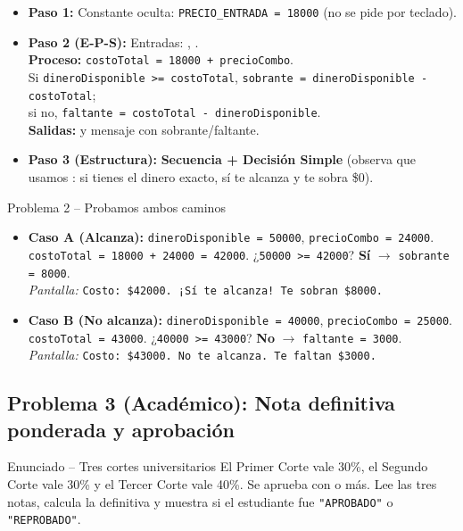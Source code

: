 \documentclass[11pt,letterpaper]{article}
\begin{document}
\begin{itemize}
  \item \textbf{Paso 1:} Constante oculta: \texttt{PRECIO\_ENTRADA = 18000} (no se pide por teclado).
  \item \textbf{Paso 2 (E-P-S):} Entradas: , .\\
        \textbf{Proceso:} \texttt{costoTotal = 18000 + precioCombo}.\\
        Si \texttt{dineroDisponible >= costoTotal}, \texttt{sobrante = dineroDisponible - costoTotal};\\
        si no, \texttt{faltante = costoTotal - dineroDisponible}.\\
        \textbf{Salidas:}  y mensaje con sobrante/faltante.
  \item \textbf{Paso 3 (Estructura):} \textbf{Secuencia + Decisión Simple} (observa que usamos \codigo{>=}: si tienes el dinero exacto, sí te alcanza y te sobra \$0).
\end{itemize}

\begin{pruebaescritorio}{Problema 2 -- Probamos ambos caminos}
\begin{itemize}
  \item \textbf{Caso A (Alcanza):} \texttt{dineroDisponible = 50000}, \texttt{precioCombo = 24000}.\\
        \texttt{costoTotal = 18000 + 24000 = 42000}. ¿\texttt{50000 >= 42000}? \textbf{Sí} $\rightarrow$ \texttt{sobrante = 8000}.\\
        \textit{Pantalla:} \texttt{Costo: \$42000. ¡Sí te alcanza! Te sobran \$8000.}
  \item \textbf{Caso B (No alcanza):} \texttt{dineroDisponible = 40000}, \texttt{precioCombo = 25000}.\\
        \texttt{costoTotal = 43000}. ¿\texttt{40000 >= 43000}? \textbf{No} $\rightarrow$ \texttt{faltante = 3000}.\\
        \textit{Pantalla:} \texttt{Costo: \$43000. No te alcanza. Te faltan \$3000.}
\end{itemize}
\end{pruebaescritorio}

\subsection{Problema 3 (Académico): Nota definitiva ponderada y aprobación}
\begin{analisis}{Enunciado -- Tres cortes universitarios}
El Primer Corte vale 30\%, el Segundo Corte vale 30\% y el Tercer Corte vale 40\%. Se aprueba con  o más. Lee las tres notas, calcula la definitiva y muestra si el estudiante fue \texttt{"APROBADO"} o \texttt{"REPROBADO"}.
\end{analisis}
\end{document}
